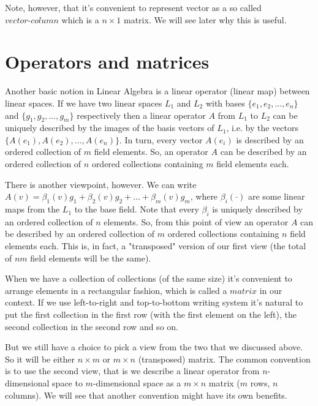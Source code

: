 \documentclass{article}
\begin{document}
Note, however, that it's convenient to represent vector as a so called $\textit{vector-column}$ which is a $n \times 1$ matrix. 
We will see later why this is useful. 

\section{Operators and matrices}

Another basic notion in Linear Algebra is a linear operator (linear map) between linear spaces. 
If we have two linear spaces $L_1$ and $L_2$ with bases $\{e_1, e_2, ... , e_n\}$ and $\{g_1, g_2, ... , g_m\}$ respectively then
a linear operator $A$ from $L_1$ to $L_2$ can be uniquely described by the images of the basis vectors of $L_1$, 
i.e. by the vectors $\{A(e_1), A(e_2), ... ,A(e_n)\}$. 
In turn, every vector $A(e_i)$ is described by an ordered collection of $m$ field elements.
So, an operator $A$ can be described by an ordered collection of $n$ ordered collections containing $m$ field elements each. 

There is another viewpoint, however. We can write $A(v) = \beta_1(v) g_1 + \beta_2(v) g_2 + ... + \beta_m(v) g_m $, 
where $\beta_i(\cdot)$ are some linear maps from the $L_1$ to the base field. 
Note that every $\beta_i$ is uniquely described by an ordered collection of $n$ elements.
So, from this point of view an operator $A$ can be described by an ordered collection of $m$ ordered collections containing $n$ field elements each. 
This is, in fact, a "transposed" version of our first view (the total of $nm$ field elements will be the same).

When we have a collection of collections (of the same size) it's convenient to arrange elements in a rectangular fashion, 
which is called a $\textit{matrix}$ in our context.
If we use left-to-right and top-to-bottom writing system it's natural to put the first collection in the first row 
(with the first element on the left), 
the second collection in the second row and so on. 

But we still have a choice to pick a view from the two that we discussed above. 
So it will be either $n \times m$ or $m \times n$ (transposed) matrix.
The common convention is to use the second view, 
that is we describe a linear operator from $n$-dimensional space to $m$-dimensional space
as a $m \times n$ matrix ($m$ rows, $n$ columns). We will see that another convention might have its own benefits. 
\end{document}
